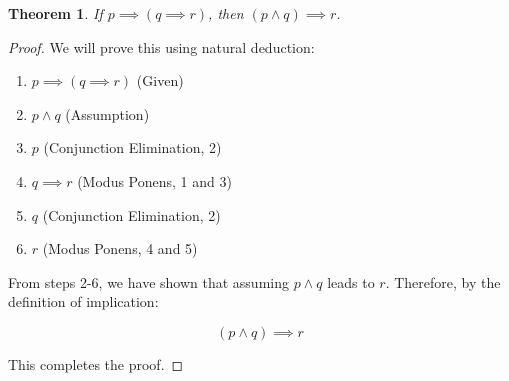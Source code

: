 \documentclass{article}
\newtheorem{theorem}{Theorem}
\begin{document}
\begin{theorem}
If $p \implies (q \implies r)$, then $(p \land q) \implies r$.
\end{theorem}

\begin{proof}
We will prove this using natural deduction:

\begin{enumerate}
    \item $p \implies (q \implies r)$ (Given)
    \item $p \land q$ (Assumption)
    \item $p$ (Conjunction Elimination, 2)
    \item $q \implies r$ (Modus Ponens, 1 and 3)
    \item $q$ (Conjunction Elimination, 2)
    \item $r$ (Modus Ponens, 4 and 5)
\end{enumerate}

From steps 2-6, we have shown that assuming $p \land q$ leads to $r$. Therefore, by the definition of implication:

\[
(p \land q) \implies r
\]

This completes the proof.
\end{proof}
\end{document}
